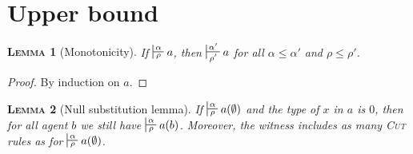 \documentclass{article}
\newtheorem{lemma}{\textsc{Lemma}}
\begin{document}
\section{Upper bound}

\begin{lemma}[Monotonicity]
If $\sststile{\rho}{\alpha} a$, then $\sststile{\rho'}{\alpha'} a$ for all $\alpha \leq \alpha'$ and $\rho \leq \rho'$.
\label{monotonicity}
\end{lemma}
\begin{proof}
By induction on $a$.
\end{proof}

\begin{lemma}[Null substitution lemma]
If $\sststile{\rho}{\alpha} a(\emptyset)$ and the type of $x$ in $a$ is $0$, then for all agent $b$ we still have $\sststile{\rho}{\alpha} a(b)$. Moreover, the witness includes as many \textsc{Cut} rules
as for $\sststile{\rho}{\alpha} a(\emptyset)$.
\label{first_substitution}
\end{lemma}
\end{document}
